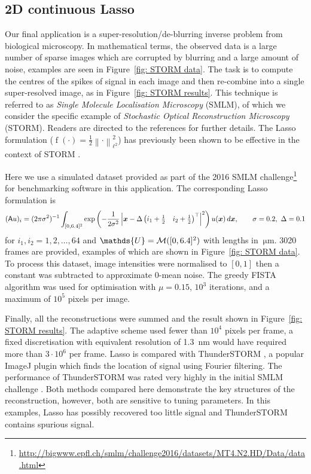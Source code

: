 \documentclass[smallextended]{svjour3}
\let\F\mathds\let\C\mathcal\newcommand{\R}{\F{R}}\newcommand{\A}{\tens{A}}
\newcommand{\norm}[1]{{\left\lVert #1 \right\rVert}}
\newcommand{\op}[1]{\operatorname{#1}}
\newcommand{\1}{\F{1}}
\newcommand*{\varf}[1]{%
	\IfEqCase{#1}{%
		{0}{u}%
		{1}{v}%
		{2}{w}%
	}[u#1]%
}
\newcommand*{\spcf}[1]{%
	\IfEqCase{#1}{%
		{0}{\F{U}}%
		{1}{\F{V}}%
		{2}{\F{W}}%
	}[\F{U}#1]%
}
\newcommand*{\varx}[1]{%
	\IfEqCase{#1}{%
		{0}{x}%
		{1}{y}%
		{2}{z}%
		{3}{r}%
	}[x#1]%
}
\newcommand*{\vvarx}[1]{\vec{\varx{#1}}}
\newcommand{\edit}[2]{{\ifmmode\text{\color{red}\sout{\ensuremath{#1}}}\else {\color{red} \sout{#1}}\fi} {\color{darkgreen} #2}}
\begin{document}
	\subsection{2D continuous Lasso}
	Our final application is a super-resolution/de-blurring inverse problem from biological microscopy. In mathematical terms, the observed data is a large number of sparse images which are corrupted by blurring and a large amount of noise, examples are seen in Figure~\ref{fig: STORM data}. The task is to compute the centres of the spikes of signal in each image and then re-combine into a single super-resolved image, as in Figure~\ref{fig: STORM results}. This technique is referred to as \emph{Single Molecule Localisation Microscopy} (SMLM), of which we consider the specific example of \emph{Stochastic Optical Reconstruction Microscopy} (STORM). Readers are directed to the references \cite{Sage2015,Sage2019,Schermelleh2019} for further details. The Lasso formulation \edit{}{($\op{f}(\cdot)=\frac12\norm{\cdot}_{\ell^2}^2$) }has previously been shown to be effective in the context of STORM \cite{Huang2017,Denoyelle2019}.
	
	Here we use a simulated dataset provided as part of the 2016 SMLM challenge\footnote{\url{http://bigwww.epfl.ch/smlm/challenge2016/datasets/MT4.N2.HD/Data/data.html}} for benchmarking software in this application. The corresponding Lasso formulation is 
	\begin{equation}
		(\A\varf0)_{i} = (2\pi\sigma^2)^{-1}\int_{[0,6.4]^2} \exp\left(-\frac{1}{2\sigma^2}\left|\vvarx0- \Delta\begin{pmatrix}i_1+\tfrac12 & i_2+\tfrac12\end{pmatrix}^\top \right|^2\right)\varf0(\vvarx0)\,d\vvarx0, \qquad \sigma=0.2,\ \Delta=0.1
	\end{equation}
	for $i_1,i_2 = 1,2,\ldots,64$ and $\spcf0=\C M([0,6.4]^2)$ with lengths in $\SI{}{\micro\meter}$. 3020 frames are provided, examples of which are shown in Figure~\ref{fig: STORM data}. To process this dataset, image intensities were normalised to $[0,1]$ then a constant was subtracted to approximate 0-mean noise. The greedy FISTA algorithm was used for optimisation with $\mu=0.15$, $10^3$ iterations, and a maximum of $10^5$ pixels per image. 
	
	Finally, all the reconstructions were summed and the result shown in Figure~\ref{fig: STORM results}. The adaptive scheme used fewer than $10^4$ pixels per frame, a fixed discretisation with equivalent resolution of \SI{1.3}{\nano\meter} would have required more than $3\cdot10^6$ per frame. Lasso is compared with ThunderSTORM \cite{Ovesny2014}, a popular ImageJ plugin \cite{Schindelin2012} which finds the location of signal using Fourier filtering. The performance of ThunderSTORM was rated very highly in the initial SMLM challenge \cite{Sage2015}. Both methods compared here demonstrate the key structures of the reconstruction, however, both are sensitive to tuning parameters. In this examples, Lasso has possibly recovered too little signal and ThunderSTORM contains spurious signal. 
	
\end{document}

